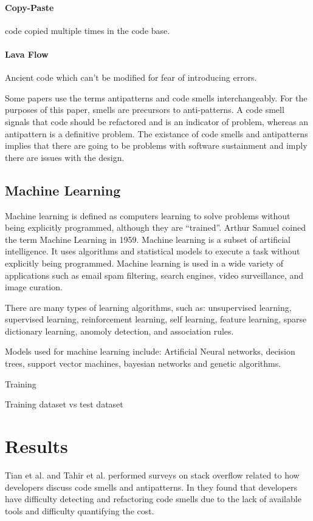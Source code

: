 \documentclass[conference]{IEEEtran}
\begin{document}
\paragraph{Copy-Paste} code copied multiple times in the code base.
\paragraph{Lava Flow} Ancient code which can't be modified for fear of introducing errors.

Some papers use the terms antipatterns and code smells interchangeably\cite{singh_systematic_2018}. 
For the purposes of this paper, smells are precursors to anti-patterns. 
A code smell signals that code should be refactored and is an indicator of problem, whereas an antipattern is a definitive problem. 
The existance of code smells and antipatterns implies that there are going to be problems with software sustainment and imply there are issues with the design.


\subsection{Machine Learning}
Machine learning is defined as computers learning to solve problems without being explicitly programmed, although they are ``trained''\cite{bishop_pattern_2006}. 
Arthur Samuel coined the term Machine Learning in 1959\cite{samuel_studies_1988}.
Machine learning is a subset of artificial intelligence. 
It uses algorithms and statistical models to execute a task without explicitly being programmed.
Machine learning is used in a wide variety of applications such as email spam filtering, search engines, video surveillance, and image curation.

There are many types of learning algorithms, such as: unsupervised learning, supervised learning, reinforcement learning, self learning, feature learning, sparse dictionary learning, anomoly detection, and association rules.

Models used for machine learning include: Artificial Neural networks, decision trees, support vector machines, bayesian networks and genetic algorithms.

Training

Training dataset vs test dataset

\section{Results}
Tian et al.\cite{tian_how_2019} and Tahir et al.\cite{tahir_can_2018} performed surveys on stack overflow related to how developers discuss code smells and antipatterns. In \cite{tian_how_2019} they found that developers have difficulty detecting and refactoring code smells due to the lack of available tools and difficulty quantifying the cost.
\end{document}
